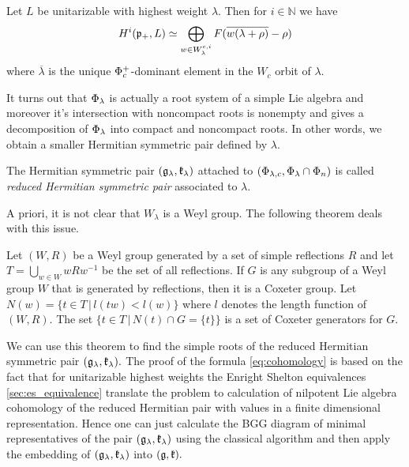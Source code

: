 \begin{theorem}\label{thm:cohomology}
 Let $L$ be unitarizable with highest weight $\lambda $. Then for $i\in \mathbb{N}$ we have
\begin{equation}\label{eq:cohomology}
 H^i(\mathfrak{p}_+,L)\simeq \bigoplus_{w\in W^{c,i}_\lambda} F(\overline{w(\lambda+\rho)} - \rho)
\end{equation}
where  $\overline{\lambda}$ is the unique $\Phi_c^+$-dominant element in the $W_c$ orbit of $\lambda$.
\end{theorem}

It turns out that $\Phi_\lambda$ is actually a root system of a simple Lie algebra and moreover it's intersection with noncompact roots is nonempty and gives a decomposition of $\Phi_\lambda$ into compact and noncompact roots. In other words, we obtain a smaller Hermitian symmetric pair defined by $\lambda$.

\begin{definition}
 The Hermitian symmetric pair $(\mathfrak{g}_\lambda, \mathfrak{k}_\lambda)$ attached to $(\Phi_{\lambda,c}, \Phi_\lambda \cap \Phi_n)$ is called \emph{reduced Hermitian symmetric pair} associated to $\lambda$.
\end{definition}

A priori, it is not clear that $W_\lambda$ is a Weyl group. The following theorem deals with this issue. 

\begin{theorem}
	Let $(W, R)$ be a Weyl group generated by a set of simple reflections $R$ and let $T = \bigcup_{w \in W} wRw^{-1}$ be the set of all reflections. 
	If $G$ is any subgroup of a Weyl group $W$ that is generated by reflections, then it is a Coxeter group. Let $N(w) = \{ t \in T \, | \, l(tw) < l(w) \}$ where $l$ denotes the length function of $(W, R).$ The set $\{ t \in T \,|\, N(t) \cap G = \{t\} \}$ is a set of Coxeter generators for $G$.
\end{theorem}

We can use this theorem to find the simple roots of the reduced Hermitian symmetric pair $(\mathfrak{g}_\lambda, \mathfrak{k}_\lambda).$ The proof of the formula \eqref{eq:cohomology} is based on the fact that for unitarizable highest weights the Enright Shelton equivalences \ref{sec:es_equivalence} translate the problem to calculation of nilpotent Lie algebra cohomology of the reduced Hermitian pair with values in a finite dimensional representation. Hence one can just calculate the BGG diagram of minimal representatives of the pair $(\mathfrak{g}_\lambda, \mathfrak{k}_\lambda)$ using the classical algorithm and then apply the embedding of $(\mathfrak{g}_\lambda, \mathfrak{k}_\lambda)$ into $(\mathfrak{g}, \mathfrak{k}).$

